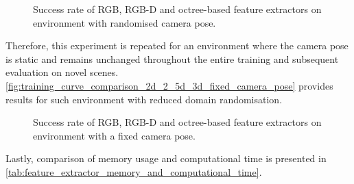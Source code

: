 \begin{figure}[ht]
    \centering
    \caption{Success rate of RGB, RGB-D and octree-based feature extractors on environment with randomised camera pose.}
    \label{fig:training_curve_comparison_2d_2_5d_3d_random_camera_pose}
\end{figure}

Therefore, this experiment is repeated for an environment where the camera pose is static and remains unchanged throughout the entire training and subsequent evaluation on novel scenes. \autoref{fig:training_curve_comparison_2d_2_5d_3d_fixed_camera_pose} provides results for such environment with reduced domain randomisation.

\begin{figure}[ht]
    \centering
    \caption{Success rate of RGB, RGB-D and octree-based feature extractors on environment with a fixed camera pose.}
    \label{fig:training_curve_comparison_2d_2_5d_3d_fixed_camera_pose}
\end{figure}

Lastly, comparison of memory usage and computational time is presented in \autoref{tab:feature_extractor_memory_and_computational_time}.

